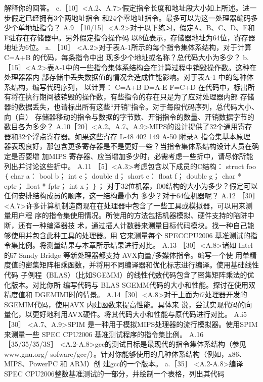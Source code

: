 解释你的回答。
c.［10］<A.2、A.7>假定指令长度和地址段大小如上所述。进一步假定已经拥有3个两地址指令
和24个零地址指令。最多可以为这一处理器编码多少个单地址指令？
A.9 ［10/15］<A.2>对于以下练习，假定A、B、C、D、E和F驻存在存储器中。另外假定指令操作码
以8位表示，存储器地址为64位，寄存器地址为6位。
a. ［10］ <A.2>对于表A-1所示的每个指令集体系结构，对于计算 C=A+B 的代码，每条指令中出
现多少个地址或名称？总代码大小为多少？
b.［15］<A.2>表A-1中的一些指令集体系结构会在计算过程中销毁操作数。这种在处理器器内
部存储中丢失数据值的情况会造成性能影响。对于表A-1 中的每种体系结构，编写代码序列，
以计算：
C=A+B
D=A-E
F=C+D
在代码中，标出所有将在执行期间被销毁的操作数，有些指令的存在只是为了应对处理器内部
存储器的数据丢失，也请标出所有这些“开销”指令。对于每段代码序列，总代码大小、向（自）
存储器移动的指令与数据的字节数、开销指令的数量、开销数据字节的数目各为多少？
A.10［20］<A.2、A.7、A.9>MIPS的设计提供了32个通用寄存器和32个浮点寄存器。如果这些寄存
L-48
402
149
A-50
附录A 指令集基本原理
器表现良好，那包含更多寄存器是不是更好一些？当指令集体系结构设计人员在确定是否要增
加MIPS 寄存器、应当增加多少时，必需考虑一些折中，请尽你所能列出并讨论这些折中。
A.11 ［5］<A.3>考虑包含以下成员的C结构：
struct foo ｛
char a：
bool b；
int c；
double d；
short e：
float f；
double g；
char * cptr；
float * fptr；
int x；
｝；
对于32位机器，f00结构的大小为多少？假定可以任何安排结构成员的顺序，这一结构最小为
多少？对于64位机器呢？
A.12 ［30］<A.7>许多计算机制造商现在在处理器中包含了一些工具或模拟器，可以用来测量用户程
序的指令集使用情况。所使用的方法包括机器模拟、硬件支持的陷阱中断，还有一种编泽器技
术，通过插人计数器来测量目标代码模块。找一种自己能够使用并包含此种工具的处理器。用
它来测量每个 SPECCPU2006 基准测试的指令集比例。将测量结果与本章所示结果进行对比。
A.13 ［30］<A.8>诸如 Intel的i7 Sandy Bridge 等新处理器都支持 AVX向量/多媒体指令。编写一个使
用单精度值的密集矩阵相乘函数，并将用不同编译器和优化标志进行编译。使用基础线性代码
子例程（BLAS）（比如SGEMM）的线性代数代码包含了密集矩阵乘法的优化版本。对比你所
编写代码与 BLAS SGEMM代码的大小和性能。探讨在使用双精度值和 DGEMIMI时的情景。
A.14［30］<A.8>对于上面为i7处理器开发的 SGEMIM代码，使用AVX 内建函数来提高性能。具体来
说，尝试实现代码的向量化，以更好地利用AVX硬件。将其代码大小和性能与原代码进行对比。
A.i5 ［30］ <A.7、A.9>SPIM 是一种用于模拟MIPS处理器的流行模拟器。使用SPIM 来测量一些 SPEC
CPU2006 基准测试程序的指令集比例。
A.16
［35/35/35/3S］ <A.2-A.8>gcc的测试目标是最现代的指令集体系结构（参见 www.gnu.org/
sofware/gcc/）。针对你能够使用的几种体系结构（例如，x86、MIPS、PowerPC 和 ARM）创
建gcc的一个版本。
a.［35］ <A.2-A.8>编译 SPEC CPU2006整数基准测试的一部分，并绘制一个表格，列出其代码
